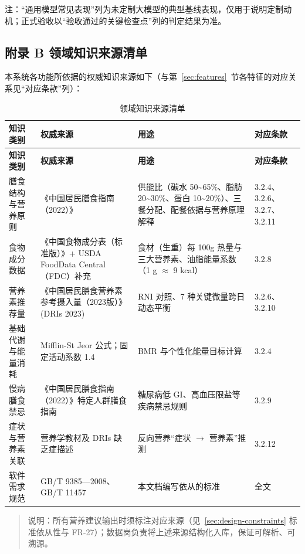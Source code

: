 \documentclass[12pt,a4paper]{ctexart}
\begin{document}
\noindent 注：“通用模型常见表现”列为未定制大模型的典型基线表现，仅用于说明定制动机；正式验收以“验收通过的关键检查点”列的判定结果为准。

\clearpage
{}
\label{appendix:a}


\label{appendix:b}
\subsection*{附录 B 领域知识来源清单}

本系统各功能所依据的权威知识来源如下（与第~\ref{sec:features}~节各特征的对应关系见“对应条款”列）：

\begin{xltabular}{\linewidth}{p{2.2cm}p{3.6cm}Lp{2.2cm}}
\caption{领域知识来源清单} \\
\toprule
\textbf{知识类别} & \textbf{权威来源} & \textbf{用途} & \textbf{对应条款} \\
\midrule
\endfirsthead
\toprule
\textbf{知识类别} & \textbf{权威来源} & \textbf{用途} & \textbf{对应条款} \\
\midrule
\endhead
膳食结构与营养原则 & 《中国居民膳食指南（2022）》 & 供能比（碳水 50\textasciitilde{}65\%、脂肪 20\textasciitilde{}30\%、蛋白 10\textasciitilde{}20\%）、三餐分配、配餐依据与营养原理解释 & 3.2.4、3.2.6、3.2.7、3.2.11 \\
食物成分数据 & 《中国食物成分表（标准版）》+ USDA FoodData Central（FDC）补充 & 食材（生重）每 100g 热量与三大营养素、油脂能量系数（1 g $\approx$ 9 kcal） & 3.2.8 \\
营养素推荐量 & 《中国居民膳食营养素参考摄入量（2023版）》(DRIs 2023) & RNI 对照、7 种关键微量跨日动态平衡 & 3.2.6、3.2.10 \\
基础代谢与能量消耗 & Mifflin-St Jeor 公式；固定活动系数 1.4 & BMR 与个性化能量目标计算 & 3.2.4 \\
慢病膳食禁忌 & 《中国居民膳食指南（2022）》特定人群膳食指南 & 糖尿病低 GI、高血压限盐等疾病禁忌规则 & 3.2.9 \\
症状与营养素关联 & 营养学教材及 DRIs 缺乏症描述 & 反向营养“症状 $\rightarrow$ 营养素”推测 & 3.2.12 \\
软件需求规范 & GB/T 9385---2008、GB/T 11457 & 本文档编写依从的标准 & 全文 \\
\bottomrule
\end{xltabular}

\begin{quote}
说明：所有营养建议输出时须标注对应来源（见~\ref{sec:design-constraints} 标准依从性与 FR-27）；数据岗负责将上述来源结构化入库，保证可解析、可溯源。
\end{quote}
\end{document}
